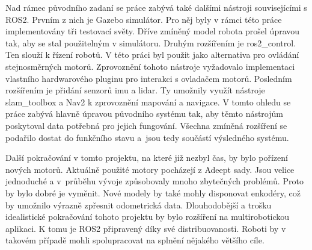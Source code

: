 Nad rámec původního zadaní se práce zabývá také dalšími nástroji souvisejícími s ROS2. Prvním z nich je Gazebo simulátor. Pro něj byly v rámci této práce implementovány tři testovací světy. Dříve zmíněný model robota prošel úpravou tak, aby se stal použitelným v simulátoru. Druhým rozšířením je ros2\_control. Ten slouží k řízení robotů. V této práci byl použit jako alternativa pro ovládání stejnosměrných motorů. Zprovoznění tohoto nástroje vyžadovalo implementaci vlastního hardwarového pluginu pro interakci s ovladačem motorů. Posledním rozšířením je přidání senzorů imu a lidar. Ty umožnily využít nástroje slam\_toolbox a Nav2 k zprovoznění mapování a navigace. V tomto ohledu se práce zabývá hlavně úpravou původního systému tak, aby těmto nástrojům poskytoval data potřebná pro jejich fungování. Všechna zmíněná rozšíření se podařilo dostat do funkčního stavu a~jsou tedy součástí výsledného systému.

Další pokračování v tomto projektu, na které již nezbyl čas, by bylo pořízení nových motorů. Aktuálně  použité motory pocházejí z Adeept sady. Jsou velice jednoduché a v~průběhu vývoje způsobovaly mnoho zbytečných problémů. Proto by bylo dobré je vyměnit. Nové modely by také mohly disponovat enkodéry, což by umožnilo výrazně zpřesnit odometrická data.
Dlouhodobější a trošku idealistické pokračování tohoto projektu by bylo rozšíření na multirobotickou aplikaci. K tomu je ROS2 připravený díky své distribuovanosti. Roboti by v takovém případě mohli spolupracovat na splnění nějakého většího cíle.


%

